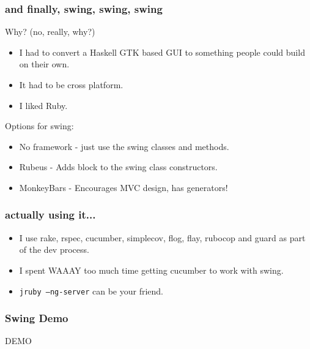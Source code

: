 \begin{frame}\frametitle{and finally, swing, swing, swing}
  Why? (no, really, why?)
  \begin{itemize}
    \item I had to convert a Haskell GTK based GUI to something people could build on their own.
    \item It had to be cross platform.
    \item I liked Ruby.
  \end{itemize}
  Options for swing:
  \begin{itemize}
    \item No framework - just use the swing classes and methods.
    \item Rubeus - Adds block to the swing class constructors.
    \item MonkeyBars - Encourages MVC design, has generators!
  \end{itemize}
\end{frame}
\begin{frame}\frametitle{actually using it...}
  \begin{itemize}
    \item I use rake, rspec, cucumber, simplecov, flog, flay, rubocop and guard as part of the dev process.
    \item I spent WAAAY too much time getting cucumber to work with swing.
    \item \texttt{jruby --ng-server} can be your friend.
    \end{itemize}
\end{frame}
\begin{frame}\frametitle{Swing Demo}
  \begin{center}
  {\Huge DEMO}
  \end{center}
\end{frame}




